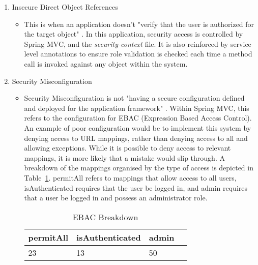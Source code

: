 \begin{enumerate}
\item Insecure Direct Object References
\begin{itemize}
\item This is when an application doesn't "verify that the user is authorized for the target object" \parencite{owasp2013}. In this application, security access is controlled by Spring MVC, and the \textit{security-context} file. It is also reinforced by service level annotations to ensure role validation is checked each time a method call is invoked against any object within the system.
\end{itemize}

\item Security Misconfiguration
\begin{itemize}
\item Security Misconfiguration is not "having a secure configuration defined and deployed for the application framework" \parencite{owasp2013}. Within Spring MVC, this refers to the configuration for EBAC (Expression Based Access Control). An example of poor configuration would be to implement this system by denying access to URL mappings, rather than denying access to all and allowing exceptions. While it is possible to deny access to relevant mappings, it is more likely that a mistake would slip through. A breakdown of the mappings organised by the type of access is depicted in Table~\ref{fig:accesstable}. permitAll refers to mappings that allow access to all users, isAuthenticated requires that the user be logged in, and admin requires that a user be logged in and possess an administrator role.

\begin{table}[H]
\caption{EBAC Breakdown}
\begin{center}
    \begin{tabular}{ | l | l | l | p{5cm} |}
    \hline
	\textbf{permitAll} & \textbf{isAuthenticated}& \textbf{admin}\\ \hline
	23 & 13 & 50\\ \hline
    \end{tabular}
\end{center}
\label{fig:accesstable}
\end{table} 
\end{itemize}


\end{enumerate}
